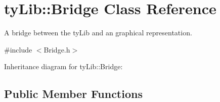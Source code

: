 \hypertarget{classty_lib_1_1_bridge}{}\section{ty\+Lib\+:\+:Bridge Class Reference}
\label{classty_lib_1_1_bridge}


A bridge between the ty\+Lib and an graphical representation.  




{\ttfamily \#include $<$Bridge.\+h$>$}



Inheritance diagram for ty\+Lib\+:\+:Bridge\+:
\subsection*{Public Member Functions}
